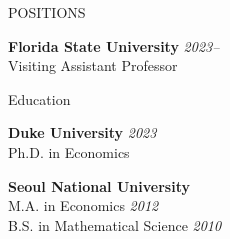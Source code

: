 


\medskip
\address{P.O. Box 3062160, 113 Collegiate Loop, Tallahassee, Florida, 32306-2160}  %

\address{ \href{mailto:ykim22@fsu.edu}{ykim22@fsu.edu} \\ \href{https://sites.google.com/view/yonggyun-yg-kim/}{https://sites.google.com/view/yonggyun-yg-kim} } %
\address{Department of Economics	Florida State University}  %






\begin{rSection}{POSITIONS}
	
	{\bf Florida State University} \hfill 
	{\em 2023--} 
	\\ 
	Visiting Assistant Professor \smallskip
	
	
\end{rSection}



\medskip



\begin{rSection}{Education}
	
	{\bf Duke University} \hfill 
	{\em 2023 } 
	\\ 
	Ph.D. in Economics \smallskip
	
	
	{\bf Seoul National University} \hfill 
	\\
	M.A. in Economics
	 \hfill {\em 2012}
	\\
	B.S. in Mathematical Science
	\hfill {\em 2010}
	
\end{rSection}



